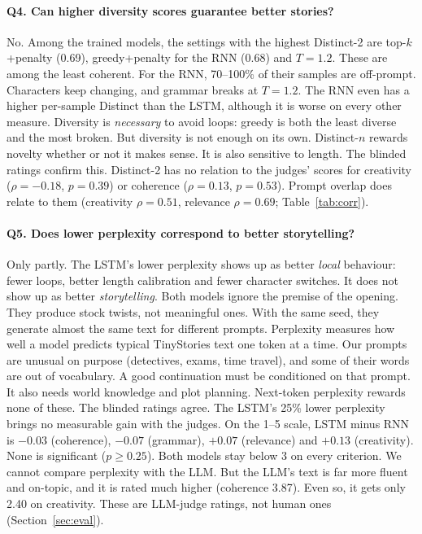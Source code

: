 \documentclass[11pt,a4paper]{article}
\begin{document}
\paragraph{Q4. Can higher diversity scores guarantee better stories?} No. Among the trained models,
the settings with the highest Distinct-2 are top-$k$+penalty (0.69), greedy+penalty for the RNN
(0.68) and $T=1.2$. These are among the least coherent. For the RNN, 70--100\% of their samples are
off-prompt. Characters keep changing, and grammar breaks at $T=1.2$. The RNN even has a higher
per-sample Distinct than the LSTM, although it is worse on every other measure. Diversity is
\emph{necessary} to avoid loops: greedy is both the least diverse and the most broken. But
diversity is not enough on its own. Distinct-$n$ rewards novelty whether or not it makes sense. It
is also sensitive to length.
The blinded ratings confirm this. Distinct-2 has no relation to the judges' scores for creativity
($\rho=-0.18$, $p=0.39$) or coherence ($\rho=0.13$, $p=0.53$). Prompt overlap does relate to them
(creativity $\rho=0.51$, relevance $\rho=0.69$; Table~\ref{tab:corr}).

\paragraph{Q5. Does lower perplexity correspond to better storytelling?} Only partly. The LSTM's
lower perplexity shows up as better \emph{local} behaviour: fewer loops, better length calibration
and fewer character switches. It does not show up as better \emph{storytelling}. Both models
ignore the premise of the opening. They produce stock twists, not meaningful ones. With the same
seed, they generate almost the same text for different prompts. Perplexity measures how well a
model predicts typical TinyStories text one token at a time. Our prompts are unusual on purpose
(detectives, exams, time travel), and some of their words are out of vocabulary. A good
continuation must be conditioned on that prompt. It also needs world knowledge and plot planning.
Next-token perplexity rewards none of these. The blinded ratings agree. The LSTM's 25\% lower
perplexity brings no measurable gain with the judges. On the 1--5 scale, LSTM minus RNN is $-0.03$
(coherence), $-0.07$ (grammar), $+0.07$ (relevance) and $+0.13$ (creativity). None is significant
($p\geq0.25$). Both models stay below 3 on every criterion. We cannot
compare perplexity with the LLM. But the LLM's text is far more fluent and on-topic, and it is
rated much higher (coherence 3.87). Even so, it gets only 2.40 on creativity. These are LLM-judge
ratings, not human ones (Section~\ref{sec:eval}).
\end{document}
